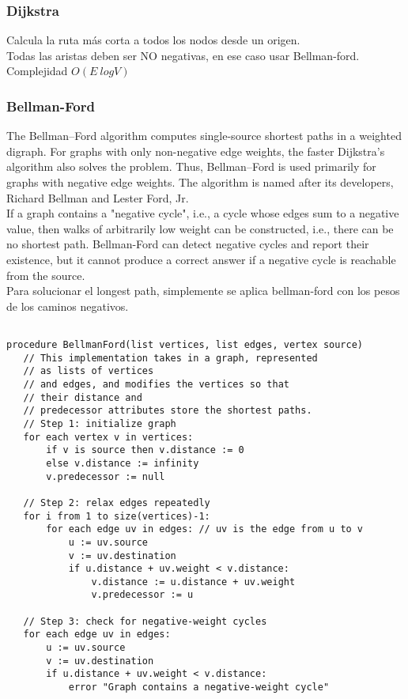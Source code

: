 \documentclass[10pt,letterpaper,twocolumn,twosided]{article}
\newcommand{\codigofuente}[1]{

\dotfill
}
\begin{document}
\subsubsection{Dijkstra}

Calcula la ruta más corta a todos los nodos desde un origen.\\
Todas las aristas deben ser NO negativas, en ese caso usar Bellman-ford.\\
Complejidad $O(E\ log V)$

\codigofuente{../src/graphs/dijkstra.${EXT}}


\subsubsection{Bellman-Ford}

The Bellman–Ford algorithm computes single-source shortest paths in a weighted digraph. For graphs with
only non-negative edge weights, the faster Dijkstra's algorithm also solves the problem. Thus, Bellman–Ford
is used primarily for graphs with negative edge weights. The algorithm is named after its developers, Richard
Bellman and Lester Ford, Jr.\\

If a graph contains a "negative cycle", i.e., a cycle whose edges sum to a negative value, then walks of
arbitrarily low weight can be constructed, i.e., there can be no shortest path. Bellman-Ford can detect
negative cycles and report their existence, but it cannot produce a correct answer if a negative cycle is
reachable from the source.\\

Para solucionar el longest path, simplemente se aplica bellman-ford con los pesos de los caminos negativos.
\begin{verbatim}

procedure BellmanFord(list vertices, list edges, vertex source)
   // This implementation takes in a graph, represented
   // as lists of vertices
   // and edges, and modifies the vertices so that 
   // their distance and
   // predecessor attributes store the shortest paths.
   // Step 1: initialize graph
   for each vertex v in vertices:
       if v is source then v.distance := 0
       else v.distance := infinity
       v.predecessor := null

   // Step 2: relax edges repeatedly
   for i from 1 to size(vertices)-1:
       for each edge uv in edges: // uv is the edge from u to v
           u := uv.source
           v := uv.destination
           if u.distance + uv.weight < v.distance:
               v.distance := u.distance + uv.weight
               v.predecessor := u

   // Step 3: check for negative-weight cycles
   for each edge uv in edges:
       u := uv.source
       v := uv.destination
       if u.distance + uv.weight < v.distance:
           error "Graph contains a negative-weight cycle"
\end{verbatim}
\end{document}
